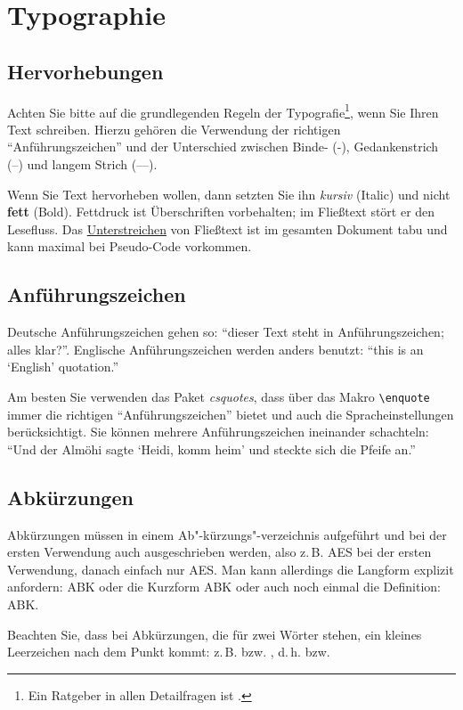 \documentclass[conference,compsoc,final,a4paper]{IEEEtran}
\begin{document}
\section{Typographie}
\subsection{Hervorhebungen}\label{Einleitung:Textauszeichnungen}
Achten Sie bitte auf die grundlegenden Regeln der Typografie\footnote{Ein Ratgeber in allen Detailfragen ist \cite{Forssman2002}.}, wenn Sie Ihren Text schreiben. Hierzu gehören \zb{} die Verwendung der richtigen "`Anführungszeichen"' und der Unterschied zwischen Binde- (-), Gedankenstrich (--) und langem Strich (---).

Wenn Sie Text hervorheben wollen, dann setzten Sie ihn \textit{kursiv} (Italic) und nicht \textbf{fett} (Bold). Fettdruck ist Überschriften vorbehalten; im Fließtext stört er den Lesefluss. Das \underline{Unterstreichen} von Fließtext ist im gesamten Dokument tabu und kann maximal bei Pseudo-Code vorkommen.

\subsection{Anführungszeichen}
Deutsche Anführungszeichen gehen so: "`dieser Text steht in \glq Anführungszeichen\grq; alles klar?"'. Englische Anführungszeichen werden anders benutzt: ``this is an `English' quotation.''

Am besten Sie verwenden das Paket \textit{csquotes}, dass über das Makro \lstinline+\enquote+ immer die richtigen \enquote{Anführungszeichen} bietet und auch die Spracheinstellungen berücksichtigt. Sie können mehrere Anführungszeichen ineinander schachteln: \enquote{Und der Almöhi sagte \enquote{Heidi, komm heim} und steckte sich die Pfeife an.}

\subsection{Abkürzungen}
Abkürzungen müssen in einem Ab"-kürzungs"-verzeichnis aufgeführt und bei der ersten Verwendung auch ausgeschrieben werden, also z.\,B. \ac{AES} bei der ersten Verwendung, danach einfach nur \ac{AES}. Man kann allerdings die Langform explizit anfordern: \acl{ABK} oder die Kurzform \acs{ABK} oder auch noch einmal die Definition: \acf{ABK}.

Beachten Sie, dass bei Abkürzungen, die für zwei Wörter stehen, ein kleines Leerzeichen nach dem Punkt kommt: z.\,B. bzw. \zb{}, d.\,h. bzw. \dahe{}
\end{document}
